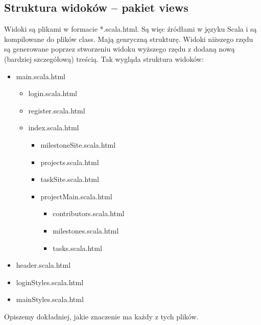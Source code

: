 \documentclass[a4paper,12pt,notitlepage]{mwrep}
\begin{document}
\subsection{Struktura widoków -- pakiet views}
Widoki są plikami w formacie *.scala.html. Są więc źródłami w języku Scala i są kompilowane do plików class. Mają genryczną strukturę. Widoki 
niższego rzędu są generowane poprzez stworzeniu widoku wyższego rzędu z dodaną nową (bardziej szczegółową) treścią. Tak wygląda struktura widoków:

\begin{itemize}
	\item	main.scala.html
	\begin{itemize}
		\item	login.scala.html
		\item	register.scala.html
		\item	index.scala.html
		\begin{itemize}
			\item	milestoneSite.scala.html
			\item	projects.scala.html
			\item	taskSite.scala.html
			\item	projectMain.scala.html
			\begin{itemize}
				\item	contributors.scala.html
				\item	milestones.scala.html
				\item	tasks.scala.html
			\end{itemize}
		\end{itemize}
	\end{itemize}
	\item	header.scala.html
	\item	loginStyles.scala.html
	\item	mainStyles.scala.html
\end{itemize}

Opiszemy dokładniej, jakie znaczenie ma każdy z tych plików.
\end{document}
